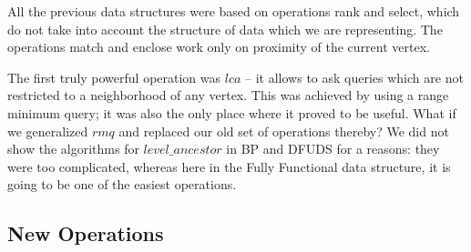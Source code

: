 All the previous data structures were based on operations rank and select, which do not take into account the structure of data which we are representing.
The operations match and enclose work only on proximity of the current vertex.

The first truly powerful operation was $lca$ -- it allows to ask queries which are not restricted to a neighborhood of any vertex.
This was achieved by using a range minimum query; it was also the only place where it proved to be useful.
What if we generalized $rmq$ and replaced our old set of operations thereby?
We did not show the algorithms for $level\_ancestor$ in BP and DFUDS for a reasons: they were too complicated, whereas here in the Fully Functional data structure, it is going to be one of the easiest operations.


\subsection{New Operations}

